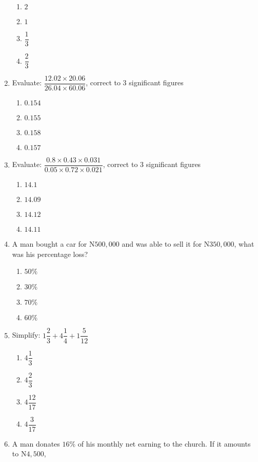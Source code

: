 \begin{multicols}{2}
\begin{enumerate}[label={\arabic*.}]
    \begin{enumerate}[label={\Alph*.}]
    \item \(2\)
    \item \(1\)
    \item \(\dfrac{1}{3}\)
    \item \(\dfrac{2}{3}\)
    \end{enumerate}
\item Evaluate: \(\dfrac{12.02 \times 20.06}{26.04 \times 60.06}\), correct to 3 significant figures
    \begin{enumerate}[label={\Alph*.}]
    \item \(0.154\)
    \item \(0.155\)
    \item \(0.158\)
    \item \(0.157\)
    \end{enumerate}
\item Evaluate: \(\dfrac{0.8 \times 0.43 \times 0.031}{0.05 \times 0.72 \times 0.021}\), correct to 3 significant figures
    \begin{enumerate}[label={\Alph*.}]
    \item \(14.1\)
    \item \(14.09\)
    \item \(14.12\)
    \item \(14.11\)
    \end{enumerate}
\item A man bought a car for N\(500, 000\) and was able to sell it for N\(350, 000\), what was his percentage loss?
    \begin{enumerate}[label={\Alph*.}]
    \item \(50\%\)
    \item \(30\%\)
    \item \(70\%\)
    \item \(60\%\)
    \end{enumerate}
\item Simplify: \(1{\dfrac{2}{3}} + 4{\dfrac{1}{4}} + 1{\dfrac{5}{12}}\)
    \begin{enumerate}[label={\Alph*.}]
    \item \(4\dfrac{1}{3}\)
    \item \(4\dfrac{2}{3}\)
    \item \(4\dfrac{12}{17}\)
    \item \(4\dfrac{3}{17}\)
    \end{enumerate}
\item A man donates \(16\%\) of his monthly net earning to the church. If it amounts to N\(4,500\), 

\end{enumerate}
\end{multicols}
